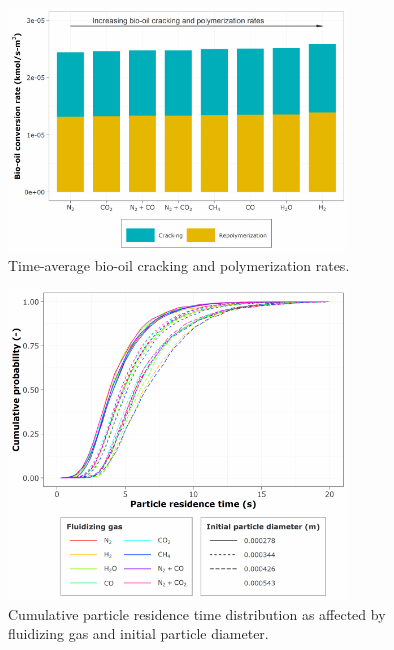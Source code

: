 \begin{figure}[H]
    \centering
    \includegraphics[width=0.8\textwidth]{figures/cfd-biooil.pdf}
    \caption{Time-average bio-oil cracking and polymerization rates.}
    \label{fig:cfd-biooil}
\end{figure}

\begin{figure}[H]
    \centering
    \includegraphics[width=0.8\textwidth]{figures/cfd-particle-time.pdf}
    \caption{Cumulative particle residence time distribution as affected by fluidizing gas and initial particle diameter.}
    \label{fig:cfd-particle-time}
\end{figure}

